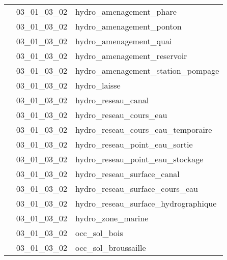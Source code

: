\documentclass[12pt,titlepage,oneside]{book}
\begin{document}
\begin{supertabular}{|p{10cm}|c|p{15cm}|}
                    & 03\_01\_03\_02 & hydro\_amenagement\_phare\\


                    & 03\_01\_03\_02 & hydro\_amenagement\_ponton\\


                    & 03\_01\_03\_02 & hydro\_amenagement\_quai\\


                    & 03\_01\_03\_02 & hydro\_amenagement\_reservoir\\


                    & 03\_01\_03\_02 & hydro\_amenagement\_station\_pompage\\


                    & 03\_01\_03\_02 & hydro\_laisse\\


                    & 03\_01\_03\_02 & hydro\_reseau\_canal\\


                    & 03\_01\_03\_02 & hydro\_reseau\_cours\_eau\\


                    & 03\_01\_03\_02 & hydro\_reseau\_cours\_eau\_temporaire\\


                    & 03\_01\_03\_02 & hydro\_reseau\_point\_eau\_sortie\\


                    & 03\_01\_03\_02 & hydro\_reseau\_point\_eau\_stockage\\


                    & 03\_01\_03\_02 & hydro\_reseau\_surface\_canal\\


                    & 03\_01\_03\_02 & hydro\_reseau\_surface\_cours\_eau\\


                    & 03\_01\_03\_02 & hydro\_reseau\_surface\_hydrographique\\


                    & 03\_01\_03\_02 & hydro\_zone\_marine\\


                    & 03\_01\_03\_02 & occ\_sol\_bois\\


                    & 03\_01\_03\_02 & occ\_sol\_broussaille\\



\end{supertabular}
\end{document}
